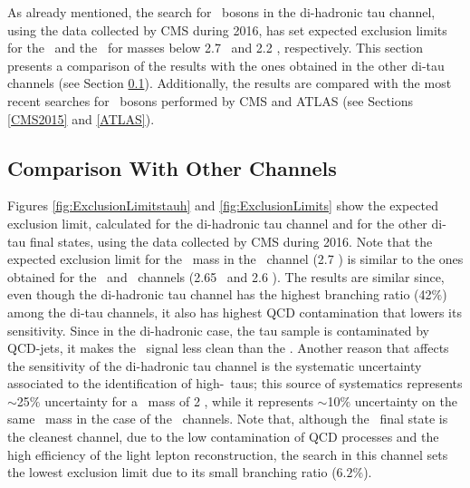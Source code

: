 \noindent As already mentioned, the search for \Zprime~bosons in the di-hadronic 
tau channel, using the data collected by CMS during 2016, has set 
expected exclusion limits for the \ZprimeSSM~and the \ZprimeTAT~for masses 
below 2.7 \TeV~and 2.2 \TeV, respectively. This section presents 
a comparison of the results with the ones obtained in the other 
di-tau channels (see Section \ref{CMS2016}). Additionally, the results are 
compared with the most recent searches for \Zprime~bosons performed by CMS and 
ATLAS (see Sections \ref{CMS2015} and \ref{ATLAS}). 

\subsection{Comparison With Other Channels}
\label{CMS2016}

Figures \ref{fig:ExclusionLimitstauh} and \ref{fig:ExclusionLimits} show the 
expected exclusion limit, calculated for the di-hadronic tau channel and for 
the other di-tau final states, using the data collected by CMS during 2016. Note that 
the expected exclusion limit for the \ZprimeSSM~mass 
in the \tauh\tauh~channel (2.7 \TeV) is similar to the ones obtained for the 
\tauh\taumu~and \tauh\taue~channels (2.65 \TeV~and 2.6 \TeV). The results are 
similar since, even though the di-hadronic tau channel has the highest 
branching ratio (42$\%$) among the di-tau channels, it also has 
highest QCD contamination that lowers its sensitivity. Since in the di-hadronic case, 
the tau sample is contaminated by QCD-jets, it makes the \tauh\tauh~signal less clean 
than the \tauh\tauell. Another reason that affects the 
sensitivity of the di-hadronic tau channel is the systematic uncertainty 
associated to the identification of high-\pt~taus; this 
source of systematics represents $\sim$25$\%$ uncertainty for a \Zprime~mass of 2 \TeV, while 
it represents $\sim$10$\%$ uncertainty on the same \Zprime~mass
in the case of the \tauh\tauell~channels. Note that, although the \taue\taumu~final 
state is the cleanest channel, due to the low contamination of QCD processes
and the high efficiency of the light lepton reconstruction, the search in this channel sets
the lowest exclusion limit due to its small branching ratio ($6.2\%$). 



